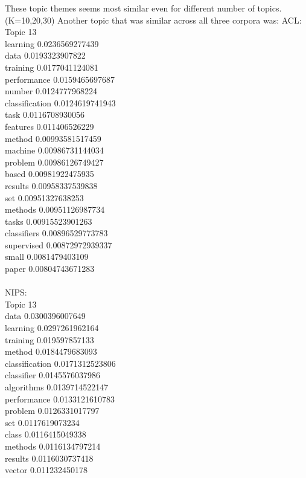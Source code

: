 \documentclass{article}
\begin{document}
These topic themes seems most similar even for different number of topics. (K=10,20,30)
Another topic that was similar across all three corpora was:
ACL:\\
Topic 13\\
learning 0.0236569277439\\
data 0.0193323907822\\
training 0.0177041124081\\
performance 0.0159465697687\\
number 0.0124777968224\\
classification 0.0124619741943\\
task 0.0116708930056\\
features 0.011406526229\\
method 0.00993581517459\\
machine 0.00986731144034\\
problem 0.00986126749427\\
based 0.00981922475935\\
results 0.00958337539838\\
set 0.00951327638253\\
methods 0.00951126987734\\
tasks 0.00915523901263\\
classifiers 0.00896529773783\\
supervised 0.00872972939337\\
small 0.0081479403109\\
paper 0.00804743671283\\
\\
NIPS:\\
Topic 13\\
data 0.0300396007649\\
learning 0.0297261962164\\
training 0.019597857133\\
method 0.0184479683093\\
classification 0.0171312523806\\
classifier 0.0145576037986\\
algorithms 0.0139714522147\\
performance 0.0133121610783\\
problem 0.0126331017797\\
set 0.0117619073234\\
class 0.0116415049338\\
methods 0.0116134797214\\
results 0.0116030737418\\
vector 0.011232450178\\
\end{document}
